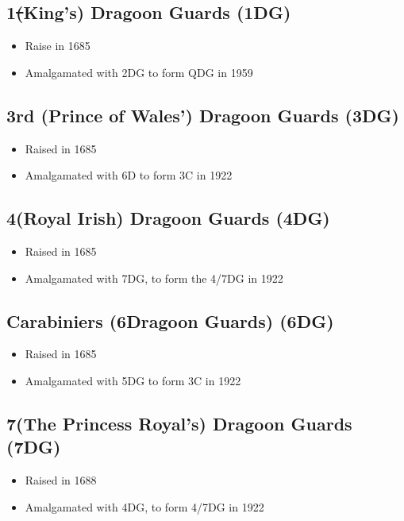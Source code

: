 \subsection*{1\st (King's) Dragoon Guards (1DG)}

\begin{itemize}
\item Raise in 1685
\item Amalgamated with 2DG to form QDG in 1959
\end{itemize}

\subsection*{3rd (Prince of Wales') Dragoon Guards (3DG)}

\begin{itemize}
\item Raised in 1685
\item Amalgamated with 6D to form 3C in 1922
\end{itemize}

\subsection*{4\nth (Royal Irish) Dragoon Guards (4DG)}

\begin{itemize}
\item Raised in 1685
\item Amalgamated with 7DG, to form the 4/7DG in 1922
\end{itemize}

\subsection*{Carabiniers (6\nth Dragoon Guards) (6DG)}

\begin{itemize}
\item Raised in 1685
\item Amalgamated with 5DG to form 3C in 1922
\end{itemize}

\subsection*{7\nth (The Princess Royal's) Dragoon Guards (7DG)}

\begin{itemize}
\item Raised in 1688
\item Amalgamated with 4DG, to form 4/7DG in 1922
\end{itemize}

